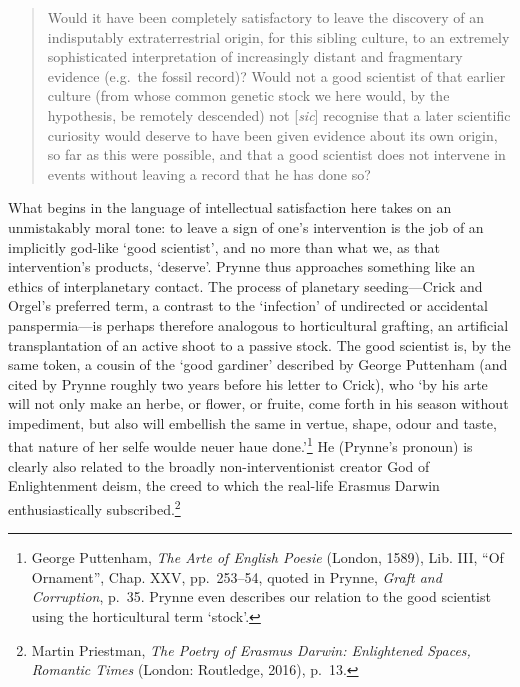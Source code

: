 \documentclass[]{article}
\begin{document}
\begin{quote}
\singlespacing Would it have been completely satisfactory to leave the
discovery of an indisputably extraterrestrial origin, for this sibling
culture, to an extremely sophisticated interpretation of increasingly
distant and fragmentary evidence (e.g.~the fossil record)? Would not a
good scientist of that earlier culture (from whose common genetic stock
we here would, by the hypothesis, be remotely descended) not
{[}\emph{sic}{]} recognise that a later scientific curiosity would
deserve to have been given evidence about its own origin, so far as this
were possible, and that a good scientist does not intervene in events
without leaving a record that he has done so?
\end{quote}

\noindent What begins in the language of intellectual satisfaction here
takes on an unmistakably moral tone: to leave a sign of one’s
intervention is the job of an implicitly god-like ‘good scientist’, and
no more than what we, as that intervention’s products, ‘deserve’. Prynne
thus approaches something like an ethics of interplanetary contact. The
process of planetary seeding—Crick and Orgel’s preferred term, a
contrast to the ‘infection’ of undirected or accidental panspermia—is
perhaps therefore analogous to horticultural grafting, an artificial
transplantation of an active shoot to a passive stock. The good
scientist is, by the same token, a cousin of the ‘good gardiner’
described by George Puttenham (and cited by Prynne roughly two years
before his letter to Crick), who ‘by his arte will not only make an
herbe, or flower, or fruite, come forth in his season without
impediment, but also will embellish the same in vertue, shape, odour and
taste, that nature of her selfe woulde neuer haue done.’\footnote{George
  Puttenham, \emph{The Arte of English Poesie} (London, 1589), Lib. III,
  “Of Ornament”, Chap. XXV, pp.~253–54, quoted in Prynne, \emph{Graft
  and Corruption}, p.~35. Prynne even describes our relation to the good
  scientist using the horticultural term ‘stock’.} He (Prynne’s pronoun)
is clearly also related to the broadly non-interventionist creator God
of Enlightenment deism, the creed to which the real-life Erasmus Darwin
enthusiastically subscribed.\footnote{Martin Priestman, \emph{The Poetry
  of Erasmus Darwin: Enlightened Spaces, Romantic Times} (London:
  Routledge, 2016), p.~13.}
\end{document}
